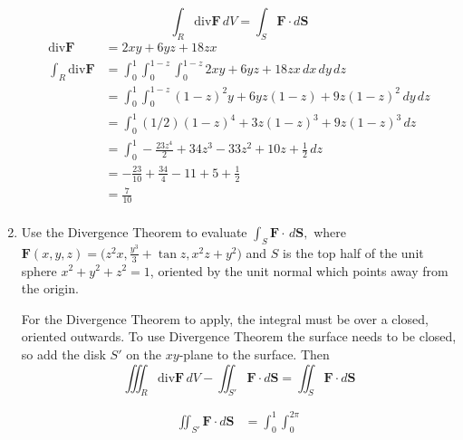 \documentclass{article}
\newcommand{\divt}{\text{div}}
\begin{document}
\begin{enumerate}
            \[\int_R \divt \boldsymbol F \, dV = \int_S \boldsymbol F \cdot d\boldsymbol S\]
            \begin{align*}
                \divt \boldsymbol F &= 2xy + 6yz + 18zx \\
                \int_R \divt \boldsymbol F &= \int_0^1 \int_0^{1-z} \int_0^{1-z} 2xy + 6yz + 18zx \, dx \, dy \, dz \\
                &= \int_0^1 \int_0^{1-z} (1-z)^2y + 6yz(1-z) + 9z(1-z)^2 \, dy \, dz \\
                &= \int_0^1 (1/2)(1-z)^4 + 3z(1-z)^3 + 9z(1-z)^3 \, dz \\
                &= \int_0^1 -\frac{23z^4}{2} + 34z^3 - 33z^2 + 10z + \frac{1}{2} \, dz \\
                &= -\frac{23}{10} + \frac{34}{4} - 11 + 5 + \frac{1}{2} \\
                &= \frac{7}{10} \\ 
            \end{align*}
            \newpage
\item Use the Divergence Theorem to evaluate $\displaystyle \int_S \boldsymbol F \cdot \, d \boldsymbol S,$ where $\displaystyle \boldsymbol F (x,y,z) = \bigg(z^2 x, \frac{y^3}{3} + \tan z, x^2z+y^2 \bigg)$ and $S$ is the top half of the unit sphere $x^2 + y^2 + z^2 = 1$, oriented by the unit normal which points away from the origin.
    
    For the Divergence Theorem to apply, the integral must be over a closed, oriented outwards. To use Divergence Theorem the surface needs to be closed, so add the disk $S'$ on the $xy$-plane to the surface. Then 
    \[\iiint_R \divt \boldsymbol F \, dV - \iint_{S'} \boldsymbol F \cdot d \boldsymbol S = \iint_S \boldsymbol F \cdot d\boldsymbol S\]

    \begin{align*} 
        \iint_{S'} \boldsymbol F \cdot d \boldsymbol S &= \int_0^1 \int_0^{2\pi} 
    \end{align*}


\end{enumerate}
\end{document}
